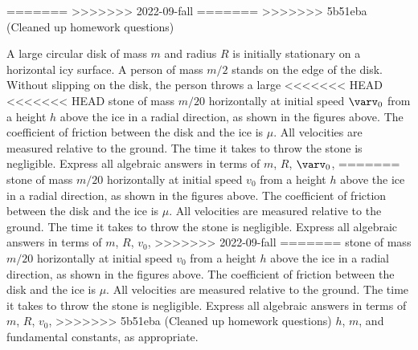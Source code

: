 \documentclass{../../oss-apphys-exam}
\begin{document}
\begin{questions}
=======
>>>>>>> 2022-09-fall
=======
>>>>>>> 5b51eba (Cleaned up homework questions)

  \question A large circular disk of mass $m$ and radius $R$ is initially
  stationary on a horizontal icy surface. A person of mass $m/2$ stands on the
  edge of the disk. Without slipping on the disk, the person throws a large
<<<<<<< HEAD
<<<<<<< HEAD
  stone of mass $m/20$ horizontally at initial speed $\varv_0$ from a height
  $h$ above the ice in a radial direction, as shown in the figures above. The
  coefficient of friction between the disk and the ice is $\mu$. All velocities
  are measured relative to the ground. The time it takes to throw the stone is
  negligible. Express all algebraic answers in terms of $m$, $R$, $\varv_0$,
=======
  stone of mass $m/20$ horizontally at initial speed $v_0$ from a height
  $h$ above the ice in a radial direction, as shown in the figures above. The
  coefficient of friction between the disk and the ice is $\mu$. All velocities
  are measured relative to the ground. The time it takes to throw the stone is
  negligible. Express all algebraic answers in terms of $m$, $R$, $v_0$,
>>>>>>> 2022-09-fall
=======
  stone of mass $m/20$ horizontally at initial speed $v_0$ from a height
  $h$ above the ice in a radial direction, as shown in the figures above. The
  coefficient of friction between the disk and the ice is $\mu$. All velocities
  are measured relative to the ground. The time it takes to throw the stone is
  negligible. Express all algebraic answers in terms of $m$, $R$, $v_0$,
>>>>>>> 5b51eba (Cleaned up homework questions)
  $h$, $m$, and fundamental constants, as appropriate.
\end{questions}
\end{document}
